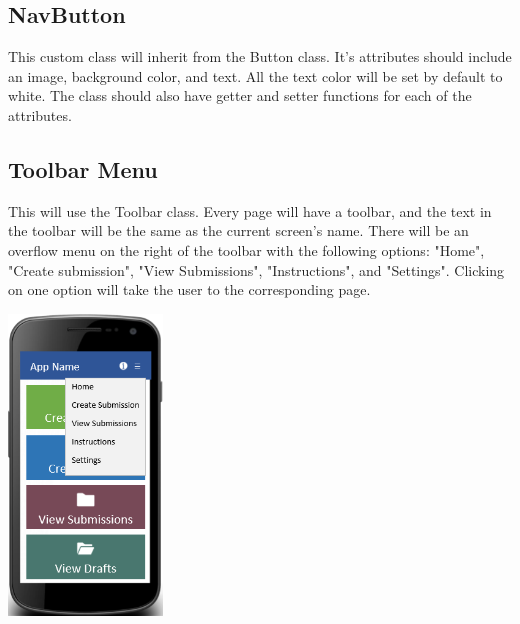 \documentclass[onecolumn, draftclsnofoot,10pt, compsoc]{IEEEtran}
\begin{document}
\subsection{NavButton}
This custom class will inherit from the Button class. It's attributes should include an image, background color, and text. All the text color will be set by default to white. The class should also have getter and setter functions for each of the attributes.

\subsection{Toolbar Menu}
This will use the Toolbar class. Every page will have a toolbar, and the text in the toolbar will be the same as the current screen's name. There will be an overflow menu on the right of the toolbar with the following options: "Home", "Create submission", "View Submissions", "Instructions", and "Settings". Clicking on one option will take the user to the corresponding page.
\newline
\begin{center}
\includegraphics[height=8cm]{menuscreen.png}
\end{center}
\end{document}
